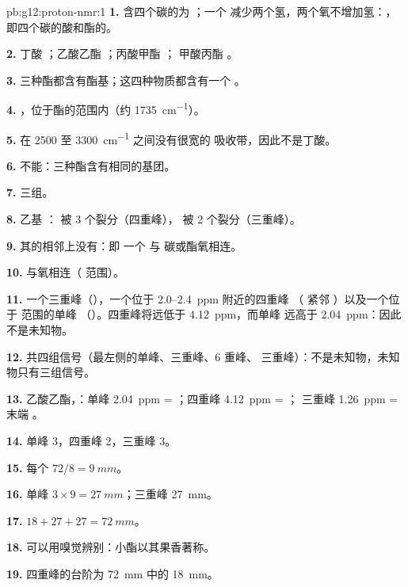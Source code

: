 \begin{solution}{pb:g12:proton-nmr:1}
\textbf{1.} 含四个碳的为 ；一个 
减少两个氢，两个氧不增加氢：，
即四个碳的酸和酯的。

\textbf{2.} 丁酸 ；乙酸乙酯
；丙酸甲酯 ；
甲酸丙酯 。

\textbf{3.} 三种酯都含有酯基；这四种物质都含有一个
。

\textbf{4.} ，位于酯的范围内（约 \qty{1735}{cm^{-1}}）。

\textbf{5.} 在 2500 至
\qty{3300}{cm^{-1}} 之间没有很宽的  吸收带，因此不是丁酸。

\textbf{6.} 不能：三种酯含有相同的基团。

\textbf{7.} 三组。

\textbf{8.} 乙基 ： 被 3 个裂分（四重峰），
 被 2 个裂分（三重峰）。

\textbf{9.} 其的相邻上没有：即
一个  与  碳或酯氧相连。

\textbf{10.}  与氧相连（ 范围）。

\textbf{11.} 一个三重峰（），一个位于 2.0--\qty{2.4}{ppm} 附近的四重峰
（ 紧邻 ）以及一个位于  范围的单峰
（）。四重峰将远低于 \qty{4.12}{ppm}，而单峰
远高于 \qty{2.04}{ppm}：因此不是未知物。

\textbf{12.} 共四组信号（最左侧的单峰、三重峰、6 重峰、
三重峰）：不是未知物，未知物只有三组信号。

\textbf{13.} 乙酸乙酯，：单峰
\qty{2.04}{ppm} = ；四重峰 \qty{4.12}{ppm} = ；
三重峰 \qty{1.26}{ppm} = 末端 。

\textbf{14.} 单峰 3，四重峰 2，三重峰 3。

\textbf{15.} 每个 $72 / 8 = \qty{9}{mm}$。

\textbf{16.} 单峰 $3 \times 9 = \qty{27}{mm}$；三重峰
\qty{27}{mm}。

\textbf{17.} $18 + 27 + 27 = \qty{72}{mm}$。

\textbf{18.} 可以用嗅觉辨别：小酯以其果香著称。

\textbf{19.} 四重峰的台阶为 \qty{72}{mm} 中的 \qty{18}{mm}。
\end{solution}
